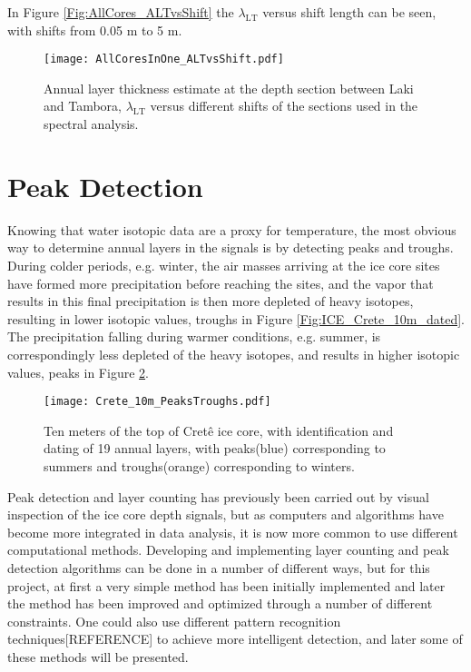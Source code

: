 \documentclass[../../CompleteThesis2/Complete_2ndDraft]{subfiles}
\begin{document}
In Figure \ref{Fig:AllCores_ALTvsShift} the $\lambda_{\text{LT}}$ versus shift length can be seen, with shifts from 0.05 m to 5 m.

\begin{figure}[h]
	\centering
	\texttt{[image: AllCoresInOne\_ALTvsShift.pdf]}
	\caption[$\lambda_{\text{LT}}0$ vs. $s_{\text{sec}}$]{\small Annual layer thickness estimate at the depth section between Laki and Tambora, $\lambda_{\text{LT}}$ versus different shifts of the sections used in the spectral analysis.}
	\label{fig:AllCores_ALTvsShift}
\end{figure}




\section[Peak Detection]{Peak Detection}
\label{Sec:CompMeths_PeakDetection}

Knowing that water isotopic data are a proxy for temperature, the most obvious way to determine annual layers in the signals is by detecting peaks and troughs. During colder periods, e.g. winter, the air masses arriving at the ice core sites have formed more precipitation before reaching the sites, and the vapor that results in this final precipitation is then more depleted of heavy isotopes, resulting in lower isotopic values, troughs in Figure \ref{Fig:ICE_Crete_10m_dated}. The precipitation falling during warmer conditions, e.g. summer, is correspondingly less depleted of the heavy isotopes, and results in higher isotopic values, peaks in Figure \ref{Fig:COMPMETH_Crete_10m_PeaksTroughs}.
\begin{figure}[h]
	\centering
	\texttt{[image: Crete\_10m\_PeaksTroughs.pdf]}
	\caption[10 m of Crête core with peaks and troughs.]{\small Ten meters of the top of Cretê ice core, with identification and dating of 19 annual layers, with peaks(blue) corresponding to summers and troughs(orange) corresponding to winters.}
	\label{Fig:COMPMETH_Crete_10m_PeaksTroughs}
\end{figure}

Peak detection and layer counting has previously been carried out by visual inspection of the ice core depth signals, but as computers and algorithms have become more integrated in data analysis, it is now more common to use different computational methods. Developing and implementing layer counting and peak detection algorithms can be done in a number of different ways, but for this project, at first a very simple method has been initially implemented and later the method has been improved and optimized through a number of different constraints. One could also use different pattern recognition techniques[REFERENCE] to achieve more intelligent detection, and later some of these methods will be presented.
\end{document}
